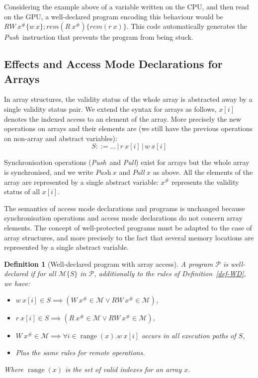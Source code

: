 \documentclass[preprint,12pt]{elsarticle}
\newcommand{\symb}[1]{\textit{#1}}
\newcommand{\Push}{\symb{Push}}
\newcommand{\Pull}{\symb{Pull}}
\newcommand{\rem}[1]{\symb{rem}(#1)}
\newtheorem{definition}{Definition}
\newcommand{\abs}[1]{#1^\#}
\newcommand{\AM}{\mathcal{M}}
\newcommand{\Prog}{\mathcal{P}}
\DeclareMathOperator{\range}{range}
\begin{document}
Considering the example above of a variable written on the CPU, and then read on the GPU, 
a well-declared program encoding this behaviour would be  $RW~\abs x\{w~x\};\rem{R~\abs 
x}\{\rem{r~x}\}$. This code automatically generates the \Push\ instruction that prevents 
the program from being stuck.
\subsection{Effects and Access Mode Declarations for Arrays}\label{sec-arrays}
In array structures, the 
validity status of the whole array is abstracted away by a single validity status pair. 
We extend the syntax for arrays as follows, $x[i]$ denotes the indexed access to an 
element of the array. More precisely the new operations on arrays and their elements are 
(we still have the previous operations on non-array and abstract variables):
\[S::= ... \,|\, r~x[i] \,|\, w~x[i] \]

Synchronisation operations (\Push\ and \Pull) exist for arrays but the whole array is 
synchronised, and we write $\Push~x$ and $\Pull~x$ as above.
All the elements of the array are represented by a single abstract variable: $\abs{x}$ 
represents the validity status of all $x[i]$.

The semantics of access mode declarations and programs is unchanged because 
synchronisation operations and access mode declarations do not concern array elements.
The concept of well-protected programs must be adapted to the case of array structures, 
and more 
precisely to the fact that several  memory locations are represented by a single abstract 
variable.


\begin{definition}[Well-declared program with array access]\label{def:well-declared-array}
A program $\Prog$ is \emph{well-declared} if for all $\AM\{S\}$ in $\Prog$, additionally 
to the rules of Definition~\ref{def-WD}, we have:
\begin{itemize}
\item $w\ x[i]\in S \implies (W\ \abs x \in \AM \lor RW\ \abs x \in \AM)$,
\item $r\ x[i]\in S \implies (R\ \abs x \in \AM \lor RW\ \abs x \in \AM)$,
\item $W\ \abs x\in \AM \implies \forall i\in\range(x). w\ x[i]$ occurs in all execution 
paths of $S$,
\item Plus the same rules for remote operations.
\end{itemize}
Where $\range(x)$ is the set of valid 
 indexes for an array $x$.
\end{definition}
\end{document}
